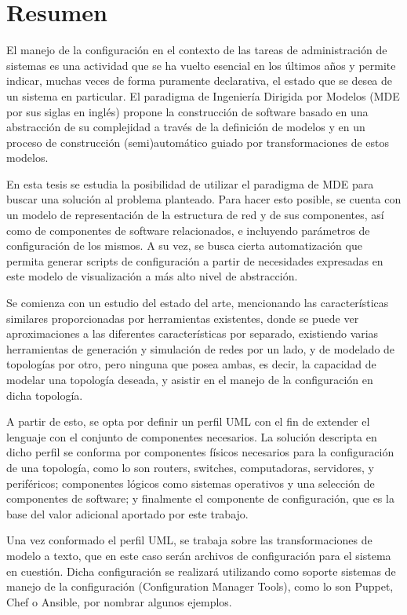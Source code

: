 \chapter*{Resumen}

El manejo de la configuración en el contexto de las tareas de administración de sistemas es una actividad que se ha vuelto esencial en los últimos años y permite indicar, muchas veces de forma puramente declarativa, el estado que se desea de un sistema en particular. El paradigma de Ingeniería Dirigida por Modelos (MDE por sus siglas en inglés) propone la construcción de software basado en una abstracción de su complejidad a través de la definición de modelos y en un proceso de construcción (semi)automático guiado por transformaciones de estos modelos.

En esta tesis se estudia la posibilidad de utilizar el paradigma de MDE para buscar una solución al problema planteado. Para hacer esto posible, se cuenta con un modelo de representación de la estructura de red y de sus componentes, así como de componentes de software relacionados, e incluyendo parámetros de configuración de los mismos. A su vez, se busca cierta automatización que permita generar scripts de configuración a partir de necesidades expresadas en este modelo de visualización a más alto nivel de abstracción.

Se comienza con un estudio del estado del arte, mencionando las características similares proporcionadas por herramientas existentes, donde se puede ver aproximaciones a las diferentes características por separado, existiendo varias herramientas de generación y simulación de redes por un lado, y de modelado de topologías por otro, pero ninguna que posea ambas, es decir, la capacidad de modelar una topología deseada, y asistir en el manejo de la configuración en dicha topología.

A partir de esto, se opta por definir un perfil UML con el fin de extender el lenguaje con el conjunto de componentes necesarios. La solución descripta en dicho perfil se conforma por componentes físicos necesarios para la configuración de una topología, como lo son routers, switches, computadoras, servidores, y periféricos; componentes lógicos como sistemas operativos y una selección de componentes de software; y finalmente el componente de configuración, que es la base del valor adicional aportado por este trabajo.

Una vez conformado el perfil UML, se trabaja sobre las transformaciones de modelo a texto, que en este caso serán archivos de configuración para el sistema en cuestión. Dicha configuración se realizará utilizando como soporte sistemas de manejo de la configuración (Configuration Manager Tools), como lo son Puppet, Chef o Ansible, por nombrar algunos ejemplos.

